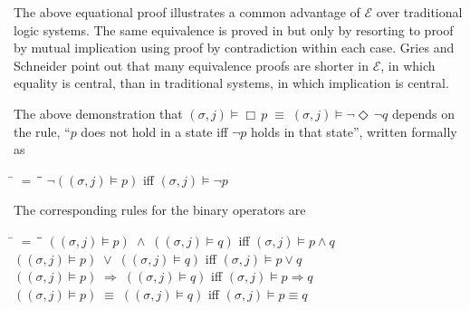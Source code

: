 \documentclass[12pt, fleqn, leqno]{article}
\newcommand{\mymathindent}{24pt}                    %
\newcommand{\equivs}{\ensuremath{\;\equiv\;}}       %
\newcommand{\impl}{\ensuremath{\Rightarrow}}        %
\newcommand{\Event}{\Diamond\,}
\newcommand{\Always}{\Box\,}
\newcommand{\myqedtab}{\hspace{384pt}}              %
\begin{document}
The above equational proof illustrates a common advantage of $\mathcal{E}$ over traditional logic systems.
The same equivalence is proved in \cite{Ben} but only by resorting to proof by mutual implication using proof by contradiction within each case.
Gries and Schneider \cite{LADM} point out that many equivalence proofs are shorter in $\mathcal{E}$, in which equality is central, than in traditional systems, in which implication is central.

The above demonstration that $(\sigma, j) \models \Always p \equivs (\sigma, j) \models \neg \Event \neg q$ depends on the
rule, ``$p$ does not hold in a state iff $\neg p$ holds in that state'', written formally as
\begin{tabbing}
\hspace{\mymathindent} \= $= \;$ \= \myqedtab \= \kill
  \> $\neg ((\sigma, j) \models p)$ \quad iff \quad $(\sigma, j) \models \neg p$
\end{tabbing}
The corresponding rules for the binary operators are
\begin{tabbing}
\hspace{\mymathindent} \= $= \;$ \= \myqedtab \= \kill
  \> $((\sigma, j) \models p) \;\land\; ((\sigma, j) \models q)$ \quad iff \quad $(\sigma, j) \models p\land q$\\
  \> $((\sigma, j) \models p) \;\lor\; ((\sigma, j) \models q)$ \quad iff \quad $(\sigma, j) \models p\lor q$\\
  \> $((\sigma, j) \models p) \;\impl\; ((\sigma, j) \models q)$ \quad iff \quad $(\sigma, j) \models p \impl q$\\
  \> $((\sigma, j) \models p) \;\equiv\; ((\sigma, j) \models q)$ \quad iff \quad $(\sigma, j) \models p \equiv q$
\end{tabbing}
\end{document}
